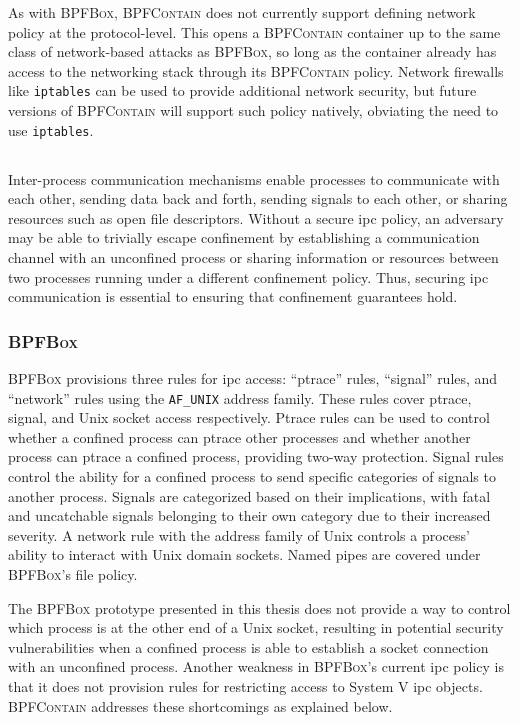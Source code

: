 \documentclass[
  fontsize=12pt,
  titlepage=firstiscover,
  paper=letter,
oneside,
  cleardoublepage=plain,
  parskip=half-,
  DIV=10,
  parindent,
  appendixprefix,
  chapterprefix,
  listof=totoc,
]{scrbook}
\newcommand{\bpfbox}{\textsc{BPFBox}}
\newcommand{\bpfcontain}{\textsc{BPFContain}}
\begin{document}
As with \bpfbox{}, \bpfcontain{} does not currently support defining network policy at the
protocol-level. This opens a \bpfcontain{} container up to the same class of network-based
attacks as \bpfbox{}, so long as the container already has access to the networking stack
through its \bpfcontain{} policy. Network firewalls like \texttt{iptables} can be used to
provide additional network security, but future versions of \bpfcontain{} will support
such policy natively, obviating the need to use \texttt{iptables}.

\subsection{}

Inter-process communication mechanisms enable processes to communicate with each other,
sending data back and forth, sending signals to each other, or sharing resources such as
open file descriptors. Without a secure \gls{ipc} policy, an adversary may be able to
trivially escape confinement by establishing a communication channel with an unconfined
process or sharing information or resources between two processes running under
a different confinement policy. Thus, securing \gls{ipc} communication is essential to
ensuring that confinement guarantees hold.

\subsubsection{\bpfbox{}}

\bpfbox{} provisions three rules for \gls{ipc} access: \enquote{ptrace} rules,
\enquote{signal} rules, and \enquote{network} rules using the \texttt{AF\_UNIX} address
family. These rules cover ptrace, signal, and Unix socket access respectively. Ptrace
rules can be used to control whether a confined process can ptrace other processes and
whether another process can ptrace a confined process, providing two-way protection.
Signal rules control the ability for a confined process to send specific categories of
signals to another process. Signals are categorized based on their implications, with
fatal and uncatchable signals belonging to their own category due to their increased
severity. A network rule with the address family of Unix controls a process' ability to interact
with Unix domain sockets. Named pipes are covered under \bpfbox{}'s file policy.

The \bpfbox{} prototype presented in this thesis does not provide a way to control which
process is at the other end of a Unix socket, resulting in potential security
vulnerabilities when a confined process is able to establish a socket connection with an
unconfined process. Another weakness in \bpfbox{}'s current \gls{ipc} policy is that it
does not provision rules for restricting access to System V \gls{ipc} objects.
\bpfcontain{} addresses these shortcomings as explained below.
\end{document}
